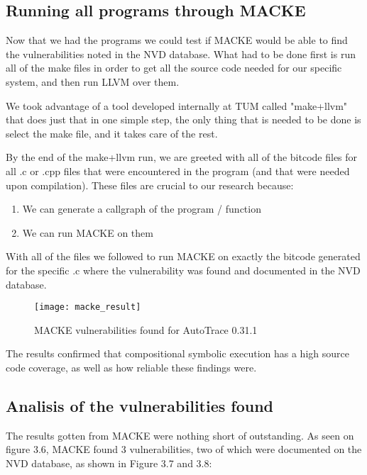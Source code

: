 \subsection{Running all programs through MACKE}

Now that we had the programs we could test if MACKE would be able to find the vulnerabilities noted in the NVD database.
What had to be done first is run all of the make files in order to get all the source code needed for our specific system, and then run LLVM over them.

We took advantage of a tool developed internally at TUM called "make+llvm"\parencite{thomasThesis} that does just that in one simple step, the only thing that is needed to be done is select the make file, and it takes care of the rest.

By the end of the make+llvm run, we are greeted with all of the bitcode files for all .c or .cpp files that were encountered in the program (and that were needed upon compilation). These files are crucial to our research because:

\begin{enumerate}
	\item We can generate a callgraph of the program / function
	\item We can run MACKE on them
\end{enumerate}

With all of the files we followed to run MACKE on exactly the bitcode generated for the specific .c where the vulnerability was found and documented in the NVD database.

\begin{figure}[!htb]
	\caption{MACKE vulnerabilities found for AutoTrace 0.31.1}
	\centering
	\texttt{[image: macke\_result]}
\end{figure}

The results confirmed that compositional symbolic execution has a high source code coverage, as well as how reliable these findings were.

\subsection{Analisis of the vulnerabilities found}

The results gotten from MACKE were nothing short of outstanding. As seen on figure 3.6, MACKE found 3 vulnerabilities, two of which were documented on the NVD database, as shown in Figure 3.7 and 3.8:

